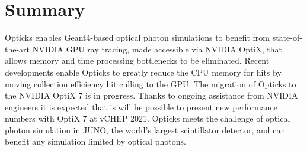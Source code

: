 \documentclass{webofc}
\begin{document}
\section{Summary}
%
Opticks enables Geant4-based optical photon simulations to benefit from 
state-of-the-art NVIDIA GPU ray tracing, made accessible via NVIDIA OptiX,
that allows memory and time processing bottlenecks to be eliminated.
Recent developments enable Opticks to greatly reduce the CPU memory for hits 
by moving collection efficiency hit culling to the GPU. The migration of Opticks to 
the NVIDIA OptiX 7 is in progress. Thanks to ongoing assistance from NVIDIA engineers 
it is expected that is will be possible to present new performance numbers with OptiX 7 at vCHEP 2021.
Opticks meets the challenge of optical photon simulation in JUNO, 
the world's largest scintillator detector, and can benefit any simulation limited by optical photons. 
%
%
%
\newpage
\end{document}
